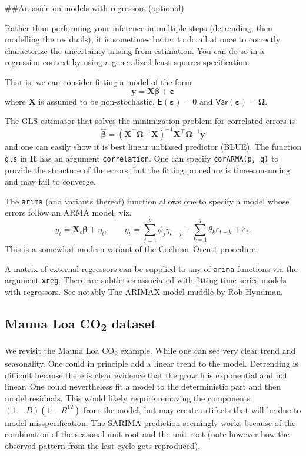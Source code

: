 \documentclass[]{book}
\begin{document}
\#\#An aside on models with regressors (optional)

Rather than performing your inference in multiple steps (detrending,
then modelling the residuals), it is sometimes better to do all at once
to correctly characterize the uncertainty arising from estimation. You
can do so in a regression context by using a generalized least squares
specification.

That is, we can consider fitting a model of the form
\[\boldsymbol{y} = \mathbf{X}\boldsymbol{\beta}+\boldsymbol{\varepsilon}\]
where \(\mathbf{X}\) is assumed to be non-stochastic,
\(\mathsf{E}(\boldsymbol{\varepsilon}) = 0\) and
\(\mathsf{Var}(\boldsymbol{\varepsilon}) = \boldsymbol{\Omega}\).

The GLS estimator that solves the minimization problem for correlated
errors is
\[\boldsymbol{\hat{\beta}} = (\mathbf{X}^\top\boldsymbol{\Omega}^{-1}\mathbf{X})^{-1}\mathbf{X}^\top\boldsymbol{\Omega}^{-1}\boldsymbol{y}\]
and one can easily show it is best linear unbiased predictor (BLUE). The
function \texttt{gls} in \textbf{R} has an argument
\texttt{correlation}. One can specify \texttt{corARMA(p,\ q)} to provide
the structure of the errors, but the fitting procedure is time-consuming
and may fail to converge.

The \texttt{arima} (and variants thereof) function allows one to specify
a model whose errors follow an ARMA model, viz.
\[ y_t = \mathbf{X}_t\boldsymbol{\beta} + \eta_t, \qquad \eta_t = \sum_{j = 1}^p\phi_j\eta_{t-j} + \sum_{k = 1}^q \theta_k\varepsilon_{t-k} + \varepsilon_t.\]
This is a somewhat modern variant of the Cochran--Orcutt procedure.

A matrix of external regressors can be supplied to any of \texttt{arima}
functions via the argument \texttt{xreg}. There are subtleties
associated with fitting time series models with regressors. See notably
\href{http://robjhyndman.com/hyndsight/arimax/}{The ARIMAX model muddle
by Rob Hyndman}.

\hypertarget{mauna-loa-co2-dataset}{%
\subsection{\texorpdfstring{Mauna Loa CO\textsubscript{2}
dataset}{Mauna Loa CO2 dataset}}\label{mauna-loa-co2-dataset}}

We revisit the Mauna Loa CO\textsubscript{2} example. While one can see
very clear trend and seasonality. One could in principle add a linear
trend to the model. Detrending is difficult because there is clear
evidence that the growth is exponential and not linear. One could
nevertheless fit a model to the deterministic part and then model
residuals. This would likely require removing the components
\((1-B)(1-B^{12})\) from the model, but may create artifacts that will
be due to model misspecification. The SARIMA prediction seemingly works
because of the combination of the seasonal unit root and the unit root
(note however how the observed pattern from the last cycle gets
reproduced).
\end{document}

